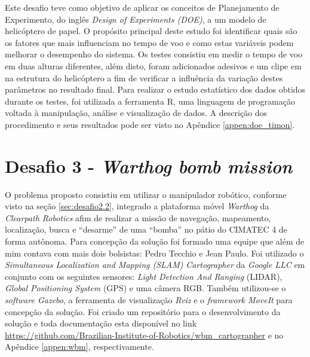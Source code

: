 Este desafio teve como objetivo de aplicar os conceitos de Planejamento de Experimento, do inglês \textit{Design of Experiments (DOE)}, a um modelo de helicóptero de papel. O propósito principal deste estudo foi  identificar quais são os fatores que mais influenciam no tempo de voo e como estas variáveis podem melhorar o desempenho do sistema. Os testes consistiu em medir o tempo de voo em duas alturas diferentes, além disto, foram adicionados adesivos e um clipe em na estrutura do helicóptero a fim de verificar a influência da variação destes parâmetros no resultado final. Para realizar o estudo estatístico dos dados obtidos durante os testes, foi utilizada a ferramenta R, uma linguagem de programação voltada à manipulação, análise e visualização de dados. A descrição dos procedimento e seus resultados pode ser visto no Apêndice \ref{appen:doe_timon}. 

\section{Desafio 3 - \textit{Warthog bomb mission}}

O problema proposto consistiu em utilizar o manipulador robótico, conforme visto na seção \ref{sec:desafio2.2}, integrado a plataforma móvel \textit{Warthog} da \textit{Clearpath Robotics} afim de realizar a missão de navegação, mapeamento, localização, busca e ``desarme'' de uma ``bomba'' no pátio do CIMATEC 4 de forma autônoma. Para concepção da solução foi formado uma equipe que além de mim contava com mais dois bolsistas: Pedro Tecchio e Jean Paulo. Foi utilizado o \textit{Simultaneous Localization and Mapping (SLAM)} \textit{Cartographer} da \textit{Google LLC} em conjunto com os seguintes sensores: \textit{Light Detection And Ranging} (LIDAR), \textit{Global Positioning System} (GPS) e uma câmera RGB. Também utilizou-se o \textit{software Gazebo}, a ferramenta de visualização \textit{Rviz} e o \textit{framework MoveIt} para concepção da solução. Foi criado um repositório para o desenvolvimento da solução e toda documentação esta disponível no link \url{https://github.com/Brazilian-Institute-of-Robotics/wbm_cartographer} e no Apêndice \ref{appen:wbm}, respectivamente.


